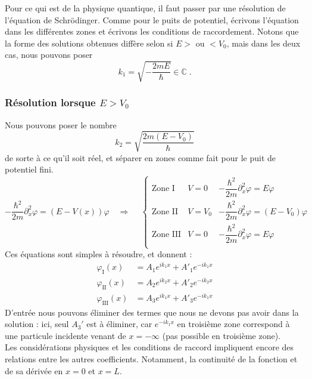 \documentclass{book}
\begin{document}
Pour ce qui est de la physique quantique, il faut passer par une résolution de l'équation de Schrödinger. Comme pour le puits de potentiel, écrivons l'équation dans les différentes zones et écrivons les conditions de raccordement. Notons que la forme des solutions obtenues diffère selon si $E>$ ou $< V_0$, mais dans les deux cas, nous pouvons poser $$k_1 = \sqrt{-\dfrac{2mE}{\hbar}} \in \mathbb{C}\; .$$
\subsubsection{Résolution lorsque $E > V_0$}
Nous pouvons poser le nombre 
$$k_2 = \sqrt{\dfrac{2m(E-V_0)}{\hbar}}$$
de sorte à ce qu'il soit réel, et séparer en zones comme fait pour le puit de potentiel fini.
\begin{equation}
  -\dfrac{\hbar^2}{2m} \partial_x ^2 \varphi = (E-V(x)) \varphi 
  \quad \Rightarrow \quad \ \left\{ 
    \begin{array}{lll}
      \text{Zone I} & V = 0 & -\dfrac{\hbar^2}{2m} \partial_x ^2 \varphi = E \varphi \\
      \text{Zone II} & V = V_0 & -\dfrac{\hbar^2}{2m} \partial_x ^2 \varphi = (E-V_0) \varphi \\
      \text{Zone III} & V = 0 & -\dfrac{\hbar^2}{2m} \partial_x ^2 \varphi = E \varphi \\
    \end{array}
    \right. 
  \end{equation}
  Ces équations sont simples à résoudre, et donnent :
  \begin{align}
    \varphi_{\mathrm{I}}(x) &= A_1 e^{ik_1 x} + A' _1 e^{-ik_1 x} \\
    \varphi_{\mathrm{II}}(x) &= A_2 e^{ik_2 x} + A' _2 e^{-ik_2 x} \\
    \varphi_{\mathrm{III}}(x) &= A_3 e^{ik_1 x} + A' _3 e^{-ik_1 x} 
  \end{align}
D'entrée nous pouvons éliminer des termes que nous ne devons pas avoir dans la solution : ici, seul $A_3'$ est à éliminer, car $e^{-ik_1x}$ en troisième zone correspond à une particule incidente venant de $x=-\infty$ (pas possible en troisième zone). \\

Les considérations physiques et les conditions de raccord impliquent encore des relations entre les autres coefficients. Notamment, la continuité de la fonction et de sa dérivée en $x=0$ et $x=L$.
\end{document}
